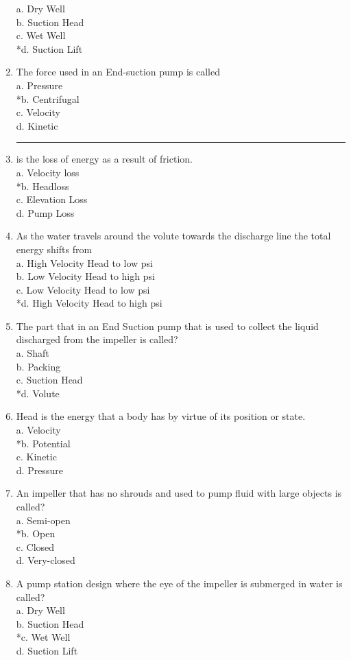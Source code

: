 \begin{enumerate}[1.]
a. Dry Well\\
b. Suction Head\\
c. Wet Well\\
*d. Suction Lift\\
\item The force used in an End-suction pump is called\\
a. Pressure\\
*b. Centrifugal\\
c. Velocity\\
d. Kinetic\\
\item \rule{1.5cm}{0.5pt} is the loss of energy as a result of friction.\\
a. Velocity loss\\
*b. Headloss\\
c. Elevation Loss\\
d. Pump Loss\\
\item As the water travels around the volute towards the discharge line the total energy shifts from\\
a. High Velocity Head to low psi\\
b. Low Velocity Head to high psi\\
c. Low Velocity Head to low psi\\
*d. High Velocity Head to high psi\\
\item The part that in an End Suction pump that is used to collect the liquid discharged from the impeller is called?\\
a. Shaft\\
b. Packing\\
c. Suction Head\\
*d. Volute\\
\item Head is the energy that a body has by virtue of its position or state.\\
a. Velocity\\
*b. Potential\\
c. Kinetic\\
d. Pressure\\
\item An impeller that has no shrouds and used to pump fluid with large objects is called?\\
a. Semi-open\\
*b. Open\\
c. Closed\\
d. Very-closed\\
\item A pump station design where the eye of the impeller is submerged in water is called?\\
a. Dry Well\\
b. Suction Head\\
*c. Wet Well\\
d. Suction Lift\\


\end{enumerate}
